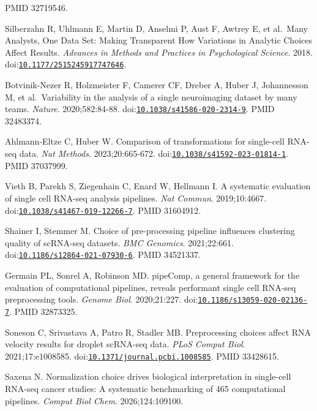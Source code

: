\documentclass[11pt]{article}
\begin{document}
\begin{enumerate}[label={[\arabic*]},leftmargin=2.6em,labelsep=0.5em,itemsep=1.5pt]
  PMID 32719546.
\item
  Silberzahn R, Uhlmann E, Martin D, Anselmi P, Aust F, Awtrey E, et
  al.~Many Analysts, One Data Set: Making Transparent How Variations in
  Analytic Choices Affect Results. \emph{Advances in Methods and
  Practices in Psychological Science}. 2018.
  doi:\href{https://doi.org/10.1177/2515245917747646}{\nolinkurl{10.1177/2515245917747646}}.
\item
  Botvinik-Nezer R, Holzmeister F, Camerer CF, Dreber A, Huber J,
  Johannesson M, et al.~Variability in the analysis of a single
  neuroimaging dataset by many teams. \emph{Nature}. 2020;582:84-88.
  doi:\href{https://doi.org/10.1038/s41586-020-2314-9}{\nolinkurl{10.1038/s41586-020-2314-9}}.
  PMID 32483374.
\item
  Ahlmann-Eltze C, Huber W. Comparison of transformations for
  single-cell RNA-seq data. \emph{Nat Methods}. 2023;20:665-672.
  doi:\href{https://doi.org/10.1038/s41592-023-01814-1}{\nolinkurl{10.1038/s41592-023-01814-1}}.
  PMID 37037999.
\item
  Vieth B, Parekh S, Ziegenhain C, Enard W, Hellmann I. A systematic
  evaluation of single cell RNA-seq analysis pipelines. \emph{Nat
  Commun}. 2019;10:4667.
  doi:\href{https://doi.org/10.1038/s41467-019-12266-7}{\nolinkurl{10.1038/s41467-019-12266-7}}.
  PMID 31604912.
\item
  Shainer I, Stemmer M. Choice of pre-processing pipeline influences
  clustering quality of scRNA-seq datasets. \emph{BMC Genomics}.
  2021;22:661.
  doi:\href{https://doi.org/10.1186/s12864-021-07930-6}{\nolinkurl{10.1186/s12864-021-07930-6}}.
  PMID 34521337.
\item
  Germain PL, Sonrel A, Robinson MD. pipeComp, a general framework for
  the evaluation of computational pipelines, reveals performant single
  cell RNA-seq preprocessing tools. \emph{Genome Biol}. 2020;21:227.
  doi:\href{https://doi.org/10.1186/s13059-020-02136-7}{\nolinkurl{10.1186/s13059-020-02136-7}}.
  PMID 32873325.
\item
  Soneson C, Srivastava A, Patro R, Stadler MB. Preprocessing choices
  affect RNA velocity results for droplet scRNA-seq data. \emph{PLoS
  Comput Biol}. 2021;17:e1008585.
  doi:\href{https://doi.org/10.1371/journal.pcbi.1008585}{\nolinkurl{10.1371/journal.pcbi.1008585}}.
  PMID 33428615.
\item
  Saxena N. Normalization choice drives biological interpretation in
  single-cell RNA-seq cancer studies: A systematic benchmarking of 465
  computational pipelines. \emph{Comput Biol Chem}. 2026;124:109100.

\end{enumerate}
\end{document}
